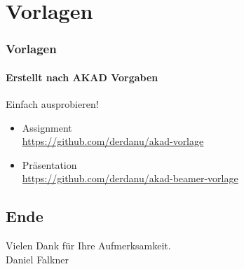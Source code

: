 \documentclass[xcolor=dvipsnames]{beamer}
\newcommand*{\Author}{Daniel Falkner} %
\begin{document}
\section{Vorlagen}
\begin{frame}
  \frametitle{Vorlagen}
  \framesubtitle{Erstellt nach AKAD Vorgaben}
	 \begin{block}{Einfach ausprobieren!}
	  \begin{itemize}
  		\item Assignment \\ \url{https://github.com/derdanu/akad-vorlage}
	  	\item Präsentation \\ \url{https://github.com/derdanu/akad-beamer-vorlage}
	  \end{itemize}
  \end{block}	
\end{frame}

\subsection*{Ende}
\begin{frame}
	\begin{block}{}	
		\begin{center}
			Vielen Dank für Ihre Aufmerksamkeit. \\
			\Author{}
		\end{center}	
	\end{block}
\end{frame}
\end{document}
